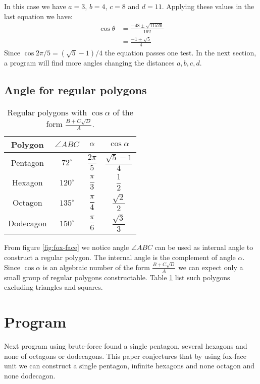 \documentclass[11pt]{article}
\begin{document}
In this case we have $a=3$, $b=4$, $c=8$ and $d=11$. Applying these values in the last equation we have:
\begin{align}
\cos{\theta} &= \frac{-48 \pm \sqrt{11520}}{192} \nonumber\\
 &= \frac{-1 \pm \sqrt{5}}{4}
\end{align}
Since $\cos{2\pi/5} = (\sqrt{5} - 1)/4$ the equation passes one test.
In the next section, a program will find more angles changing the distances $a,b,c,d$.

\subsection{Angle for regular polygons}

\begin{table}[h]
\centering
\begin{tabular}{|c c c c|}\hline
 Polygon & $\angle{ABC}$ & $\alpha$ & $\cos{\alpha}$ \rule[-2ex]{0pt}{6ex}\\ \hline\hline
 Pentagon & $72^\circ$ & $\dfrac{2\pi}{5}$ & $\dfrac{\sqrt{5}-1}{4}$ \rule[-2ex]{0pt}{6ex}\\ \hline
 Hexagon & $120^\circ$ & $\dfrac{\pi}{3}$ & $\dfrac{1}{2}$ \rule[-2ex]{0pt}{6ex}\\ \hline
 Octagon & $135^\circ$ & $\dfrac{\pi}{4}$ & $\dfrac{\sqrt{2}}{2}$ \rule[-2ex]{0pt}{6ex}\\ \hline
 Dodecagon & $150^\circ$ & $\dfrac{\pi}{6}$ & $\dfrac{\sqrt{3}}{3}$ \rule[-2ex]{0pt}{6ex}\\ 
 \hline
\end{tabular}
\caption{Regular polygons with $\cos{\alpha}$ of the form $\frac{B+C\sqrt{D}}{A}$.}
\label{tbl:polygons}
\end{table}

From figure \ref{fig:fox-face} we notice angle $\angle{ABC}$ can be used as internal angle
to construct a regular polygon.
The internal angle is the complement of angle $\alpha$. Since $\cos{\alpha}$ is an algebraic number of the form
$\frac{B+C\sqrt{D}}{A}$ we can expect only a small group of regular polygons constructable.
Table \ref{tbl:polygons} list such polygons excluding triangles and squares.

\section{Program}

Next program using brute-force found a single pentagon, several hexagons and none of octagons or dodecagons.
This paper conjectures that by using fox-face unit we can construct a single pentagon, infinite hexagons and
none octagon and none dodecagon. 
\end{document}
